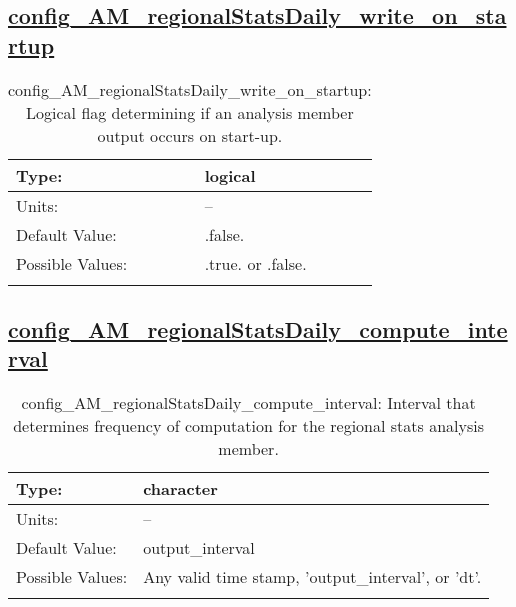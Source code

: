 \subsection[config\_AM\_regionalStatsDaily\_write\_on\_startup]{\hyperref[sec:nm_tab_AM_regionalStatsDaily]{config\_AM\_regionalStatsDaily\_write\_on\_startup}}
\label{subsec:nm_sec_config_AM_regionalStatsDaily_write_on_startup}
\begin{center}
\begin{longtable}{| p{2.0in} || p{4.0in} |}
    \hline
    Type: & logical \\
    \hline
    Units: & -- \\
    \hline
    Default Value: & .false. \\
    \hline
    Possible Values: & .true. or .false. \\
    \hline
    \caption{config\_AM\_regionalStatsDaily\_write\_on\_startup: Logical flag determining if an analysis member output occurs on start-up.}
\end{longtable}
\end{center}
\subsection[config\_AM\_regionalStatsDaily\_compute\_interval]{\hyperref[sec:nm_tab_AM_regionalStatsDaily]{config\_AM\_regionalStatsDaily\_compute\_interval}}
\label{subsec:nm_sec_config_AM_regionalStatsDaily_compute_interval}
\begin{center}
\begin{longtable}{| p{2.0in} || p{4.0in} |}
    \hline
    Type: & character \\
    \hline
    Units: & -- \\
    \hline
    Default Value: & output\_interval \\
    \hline
    Possible Values: & Any valid time stamp, 'output\_interval', or 'dt'. \\
    \hline
    \caption{config\_AM\_regionalStatsDaily\_compute\_interval: Interval that determines frequency of computation for the regional stats analysis member.}
\end{longtable}
\end{center}
